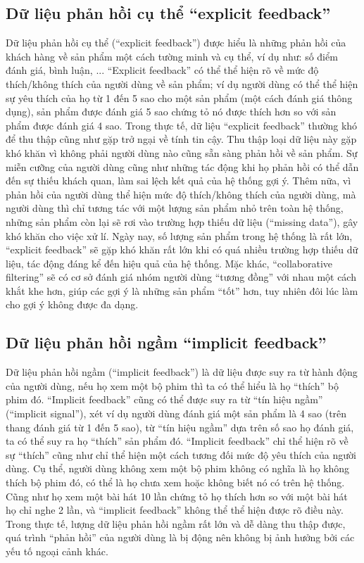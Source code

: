     \subsection{Dữ liệu phản hồi cụ thể ``explicit feedback''}
    Dữ liệu phản hồi cụ thể (``explicit feedback'') được hiểu là những
    phản hồi của khách hàng về sản phẩm một cách tường minh và cụ thể, ví dụ như: số điểm đánh giá,
    bình luận, ... ``Explicit feedback'' có thể thể hiện rõ về mức độ thích/không thích của người dùng về sản phẩm;
    ví dụ người dùng có thể thể hiện sự yêu thích của họ từ 1 đến 5 sao cho một sản phẩm (một cách đánh giá thông dụng), 
    sản phẩm được đánh giá 5 sao chứng tỏ nó được thích hơn so với sản phẩm được đánh giá 4 sao. 
    Trong thực tế, dữ liệu ``explicit feedback'' thường khó để thu thập cũng như gặp trở ngại về tính tin cậy.
    Thu thập loại dữ liệu này gặp khó khăn vì không phải người dùng nào cũng sẵn sàng phản hồi về sản phẩm. 
    Sự miễn cưỡng của người dùng cũng như những tác động khi họ phản hồi có thể dẫn đến sự thiếu khách quan,
    làm sai lệch kết quả của hệ thống gợi ý. 
    Thêm nữa, vì phản hồi của người dùng thể hiện mức độ thích/không thích của người dùng, mà người dùng thì chỉ tương tác với
    một lượng sản phẩm nhỏ trên toàn hệ thống, những sản phẩm còn lại sẽ rơi vào trường hợp thiếu dữ liệu (``missing data''),
    gây khó khăn cho việc xử lí. 
    Ngày nay, số lượng sản phẩm trong hệ thống là rất lớn, ``explicit feedback'' sẽ gặp khó khăn rất lớn khi có quá nhiều trường hợp thiếu dữ liệu,
    tác động đáng kể đến hiệu quả của hệ thống. Mặc khác, ``collaborative filtering'' sẽ có cơ sở đánh giá nhóm người dùng ``tương đồng'' với nhau
    một cách khắt khe hơn, giúp các gợi ý là những sản phẩm ``tốt'' hơn, tuy nhiên đôi lúc làm cho gợi ý không được đa dạng.

    \subsection{Dữ liệu phản hồi ngầm ``implicit feedback''}
    Dữ liệu phản hồi ngầm (``implicit feedback'') là dữ liệu được suy ra từ hành động của người dùng, nếu họ xem một bộ phim
    thì ta có thể hiểu là họ ``thích'' bộ phim đó. ``Implicit feedback'' cũng có thể được suy ra từ ``tín hiệu ngầm'' (``implicit signal''),
    xét ví dụ người dùng đánh giá một sản phẩm là 4 sao (trên thang đánh giá từ 1 đến 5 sao), từ ``tín hiệu ngầm'' dựa trên số sao họ đánh giá,
    ta có thể suy ra họ ``thích'' sản phẩm đó. 
    ``Implicit feedback'' chỉ thể hiện rõ về sự ``thích'' cũng như chỉ thể hiện một cách tương đối mức độ yêu thích của người dùng.
    Cụ thể, người dùng không xem một bộ phim không có nghĩa là họ không thích bộ phim đó, có thể là họ chưa xem hoặc không biết nó có trên hệ thống.
    Cũng như họ xem một bài hát 10 lần chứng tỏ họ thích hơn so với một bài hát họ chỉ nghe 2 lần, 
    và ``implicit feedback'' không thể thể hiện được rõ điều này.
    Trong thực tế, lượng dữ liệu phản hồi ngầm rất lớn và dễ dàng thu thập được, quá trình ``phản hồi'' của người dùng là bị động
    nên không bị ảnh hưởng bởi các yếu tố ngoại cảnh khác. 

